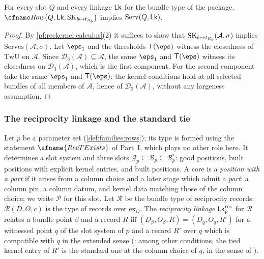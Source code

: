 \begin{lemma}\label{pf:reckernel:kerServ}
For every slot $Q$ and every linkage $\mathsf{Lk}$ for the bundle type of the package,
$\reckRow\bigl(Q,\reckLk,\reckServH_{b\mapsto t_{R_b}}\bigr)$ implies $\mathrm{Serv}(Q,\mathsf{Lk})$.
\end{lemma}

\begin{proof}
By \cref{pf:reckernel:calculus}(2) it suffices to show that $\mathrm{SK}_{b\mapsto t_{R_b}}(\mathcal A,\sigma)$ implies
$\mathrm{Serves}(\mathcal A,\sigma)$. Let $\eps_1$ and the thresholds $\mathsf T(\eps)$ witness the closedness of
$\mathrm{TwU}$ on $\mathcal A$. Since $\mathcal D_3(\mathcal A)\subseteq\mathcal A$, the same $\eps_1$ and $\mathsf T(\eps)$
witness its closedness on $\mathcal D_3(\mathcal A)$, which is the first component. For the second component take the
same $\eps_1$ and $\mathsf T(\eps)$: the kernel conditions hold at all selected bundles of all members of $\mathcal A$, hence
of $\mathcal D_3(\mathcal A)$, without any largeness assumption.
\end{proof}

\subsubsection{The reciprocity linkage and the standard tie}
Let $p$ be a parameter set (\cref{def:families:rows}); its type is formed using the statement $\sfname{RecTExists}$ of
Part~I, which plays no other role here. It determines a slot system and three slots
$\mathcal G_p\subseteq\mathcal B_p\subseteq\mathcal B^\circ_p$: good positions, built positions with explicit kernel
entries, and built positions. A core is a \emph{position with a part} if it arises from a column choice and a later
stage which admit a \emph{part}: a column pin, a column datum, and kernel data matching those of the column choice; we
write $\mathcal P$ for this slot. Let $\mathcal R$ be the bundle type of reciprocity records: $\mathcal R(D,O,c)$ is
the type of records over $\mathrm{ex}_O$. The \emph{reciprocity linkage} $\mathsf{Lk}^{\mathrm{rec}}_p$ for $\mathcal R$
relates a bundle point $\beta$ and a record $R$ iff $(D_\beta,O_\beta,R)=(D_q,O_q,R')$ for a witnessed point $q$ of the
slot system of $p$ and a record $R'$ over $q$ which is compatible with $q$ in the extended sense
(: among other conditions, the tied kernel entry of $R'$ is
the standard one at the column choice of $q$, in the sense of ).

